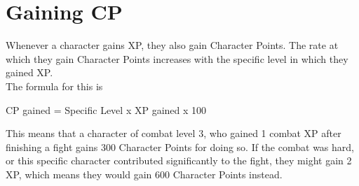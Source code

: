 \section{Gaining CP}\label{sec:gainingCP}

Whenever a character gains XP, they also gain Character Points. 
The rate at which they gain Character Points increases with the specific level in which they gained XP.\\
The formula for this is\\

\begin{center}
	CP gained = Specific Level x XP gained  x 100
\end{center}

This means that a character of combat level 3, who gained 1 combat XP after finishing a fight gains 300 Character Points for doing so. 
If the combat was hard, or this specific character contributed significantly to the fight, they might gain 2 XP, which means they would gain 600 Character Points instead.\\






